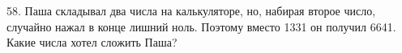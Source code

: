 58. Паша складывал два числа на калькуляторе, но, набирая второе число, случайно нажал в конце лишний ноль. Поэтому вместо 1331 он получил 6641. Какие числа хотел сложить Паша?\\
